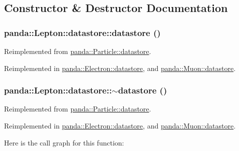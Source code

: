 \subsection{Constructor \& Destructor Documentation}
\hypertarget{structpanda_1_1Lepton_1_1datastore_adf84bb1f833eb50c3c73d81af211496e}{
\subsubsection[{datastore}]{\setlength{\rightskip}{0pt plus 5cm}panda::Lepton::datastore::datastore ()}}
\label{structpanda_1_1Lepton_1_1datastore_adf84bb1f833eb50c3c73d81af211496e}


Reimplemented from \hyperlink{structpanda_1_1Particle_1_1datastore_a6e59a47437e52ced2f9605926e0de284}{panda::Particle::datastore}.

Reimplemented in \hyperlink{structpanda_1_1Electron_1_1datastore_a2be5528c91b18d47c8c277a4f21ca899}{panda::Electron::datastore}, and \hyperlink{structpanda_1_1Muon_1_1datastore_a85904b7d723e3e95abf0901bbf3db103}{panda::Muon::datastore}.\hypertarget{structpanda_1_1Lepton_1_1datastore_aded63fdccd7551ae16f99adbd29afb82}{
\subsubsection[{$\sim$datastore}]{\setlength{\rightskip}{0pt plus 5cm}panda::Lepton::datastore::$\sim$datastore ()}}
\label{structpanda_1_1Lepton_1_1datastore_aded63fdccd7551ae16f99adbd29afb82}


Reimplemented from \hyperlink{structpanda_1_1Particle_1_1datastore_afb2d9f4926afbfa8e0f15f0d8d98094a}{panda::Particle::datastore}.

Reimplemented in \hyperlink{structpanda_1_1Electron_1_1datastore_af9dfc2f8a0fca924c40cc0d488f6bb02}{panda::Electron::datastore}, and \hyperlink{structpanda_1_1Muon_1_1datastore_a399cd7ed5610fc6c99ac1d3365ddc354}{panda::Muon::datastore}.

Here is the call graph for this function:

